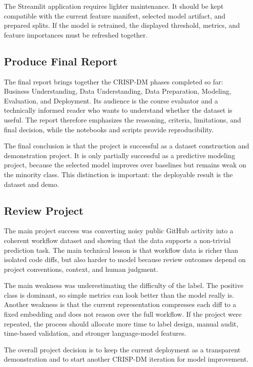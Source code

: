 The Streamlit application requires lighter maintenance. It should be kept compatible with the current feature manifest, selected model artifact, and prepared splits. If the model is retrained, the displayed threshold, metrics, and feature importances must be refreshed together.

\subsection{Produce Final Report}

The final report brings together the CRISP-DM phases completed so far: Business Understanding, Data Understanding, Data Preparation, Modeling, Evaluation, and Deployment. Its audience is the course evaluator and a technically informed reader who wants to understand whether the dataset is useful. The report therefore emphasizes the reasoning, criteria, limitations, and final decision, while the notebooks and scripts provide reproducibility.

The final conclusion is that the project is successful as a dataset construction and demonstration project. It is only partially successful as a predictive modeling project, because the selected model improves over baselines but remains weak on the minority class. This distinction is important: the deployable result is the dataset and demo.

\subsection{Review Project}

The main project success was converting noisy public GitHub activity into a coherent workflow dataset and showing that the data supports a non-trivial prediction task. The main technical lesson is that workflow data is richer than isolated code diffs, but also harder to model because review outcomes depend on project conventions, context, and human judgment.

The main weakness was underestimating the difficulty of the label. The positive class is dominant, so simple metrics can look better than the model really is. Another weakness is that the current representation compresses each diff to a fixed embedding and does not reason over the full workflow. If the project were repeated, the process should allocate more time to label design, manual audit, time-based validation, and stronger language-model features.

The overall project decision is to keep the current deployment as a transparent demonstration and to start another CRISP-DM iteration for model improvement.
